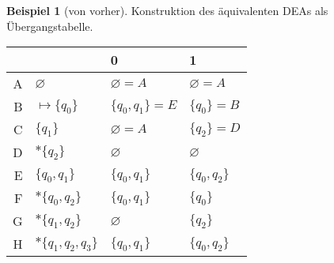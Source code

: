 \documentclass[11pt]{article} %
\theoremstyle{definition}
\newtheorem*{beispiel}{Beispiel}
\begin{document}
\begin{beispiel}[von vorher]
Konstruktion des äquivalenten DEAs als Übergangstabelle.

\begin{tabular}{rl|ll}
&& 0 & 1\\
\hline
A&$\varnothing$ & $\varnothing = A$ & $\varnothing = A$   \\
B&$\mapsto\{q_0\}$ & $\{q_0, q_1\} = E$ & $\{q_0\} = B$ \\
C&$\{q_1\}$ & $\varnothing = A$ & $\{q_2\} = D$ \\
D&$*\{q_2\}$ & $\varnothing$ & $\varnothing$ \\
E&$\{q_0, q_1\}$ & $\{q_0, q_1\}$ & $\{q_0, q_2\}$ \\
F&$*\{q_0, q_2\}$ & $\{q_0,q_1\}$ & $\{q_0\}$ \\
G&$*\{q_1, q_2\}$ & $\varnothing$ & $\{q_2\}$ \\
H&$*\{q_1, q_2, q_3\}$ & $\{q_0, q_1\}$ & $\{q_0,q_2\}$ \\
\end{tabular}


\end{beispiel}
\end{document}
